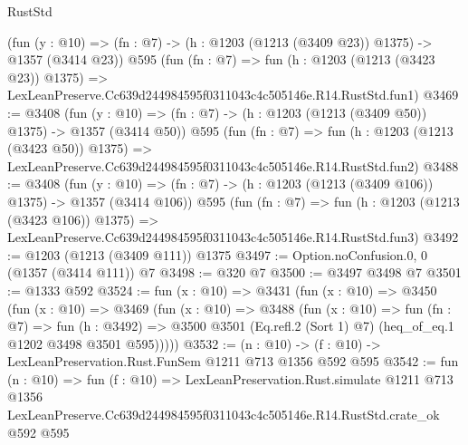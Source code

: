 \begin{lexlean}{RustStd}
\begin{coremodule}
    (fun (y : @10) => (fn : @7) -> (h : @1203 (@1213 (@3409 @23)) @1375) -> @1357 (@3414 @23))
    @595
    (fun (fn : @7) =>
    fun (h : @1203 (@1213 (@3423 @23)) @1375) =>
    LexLeanPreserve.Cc639d244984595f0311043c4c505146e.R14.RustStd.fun1)
@3469 := @3408
    (fun (y : @10) => (fn : @7) -> (h : @1203 (@1213 (@3409 @50)) @1375) -> @1357 (@3414 @50))
    @595
    (fun (fn : @7) =>
    fun (h : @1203 (@1213 (@3423 @50)) @1375) =>
    LexLeanPreserve.Cc639d244984595f0311043c4c505146e.R14.RustStd.fun2)
@3488 := @3408
    (fun (y : @10) => (fn : @7) -> (h : @1203 (@1213 (@3409 @106)) @1375) -> @1357 (@3414 @106))
    @595
    (fun (fn : @7) =>
    fun (h : @1203 (@1213 (@3423 @106)) @1375) =>
    LexLeanPreserve.Cc639d244984595f0311043c4c505146e.R14.RustStd.fun3)
@3492 := @1203 (@1213 (@3409 @111)) @1375
@3497 := Option.noConfusion.{0, 0} (@1357 (@3414 @111)) @7
@3498 := @320 @7
@3500 := @3497 @3498 @7
@3501 := @1333 @592
@3524 := fun (x : @10) =>
  @3431
    (fun (x : @10) =>
    @3450
      (fun (x : @10) =>
      @3469
        (fun (x : @10) =>
        @3488
          (fun (x : @10) =>
          fun (fn : @7) =>
          fun (h : @3492) =>
          @3500 @3501 (Eq.refl.{2} (Sort 1) @7) (heq_of_eq.{1} @1202 @3498 @3501 @595)))))
@3532 := (n : @10) -> (f : @10) -> LexLeanPreservation.Rust.FunSem @1211 @713 @1356 @592 @595
@3542 := fun (n : @10) =>
  fun (f : @10) =>
  LexLeanPreservation.Rust.simulate
    @1211
    @713
    @1356
    LexLeanPreserve.Cc639d244984595f0311043c4c505146e.R14.RustStd.crate_ok
    @592
    @595
\end{coremodule}
\end{lexlean}
